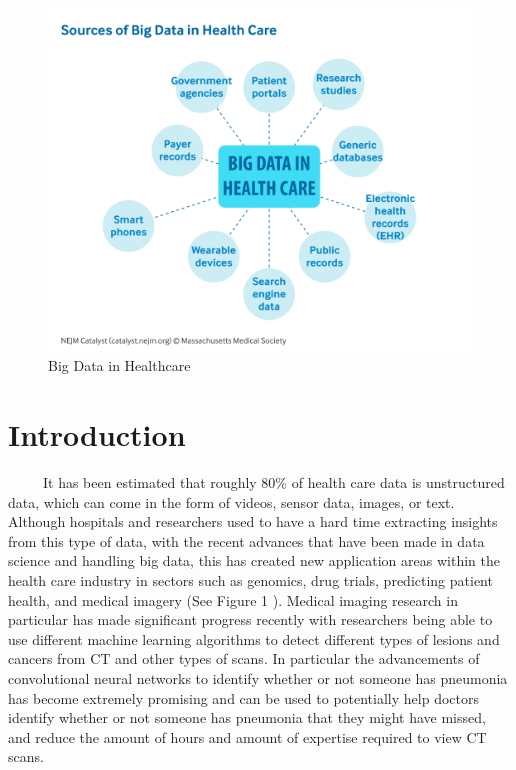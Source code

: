 \documentclass[12pt]{article}
\begin{document}
\newpage
{} %

\begin{figure}

{\centering \includegraphics[width=0.75\linewidth,height=0.25\textheight]{images/big-data-healthcare} 

}

\caption{Big Data in Healthcare}\label{fig:sample-fig1}
\end{figure}

\hypertarget{introduction}{%
\section{Introduction}\label{introduction}}

~~~~~It has been estimated that roughly 80\% of health care data is
unstructured data, which can come in the form of videos, sensor data,
images, or text. Although hospitals and researchers used to have a hard
time extracting insights from this type of data, with the recent
advances that have been made in data science and handling big data, this
has created new application areas within the health care industry in
sectors such as genomics, drug trials, predicting patient health, and
medical imagery (See Figure 1 \citet{NEJM}). Medical imaging research in
particular has made significant progress recently with researchers being
able to use different machine learning algorithms to detect different
types of lesions and cancers from CT and other types of scans. In
particular the advancements of convolutional neural networks to identify
whether or not someone has pneumonia has become extremely promising and
can be used to potentially help doctors identify whether or not someone
has pneumonia that they might have missed, and reduce the amount of
hours and amount of expertise required to view CT scans.
\end{document}

